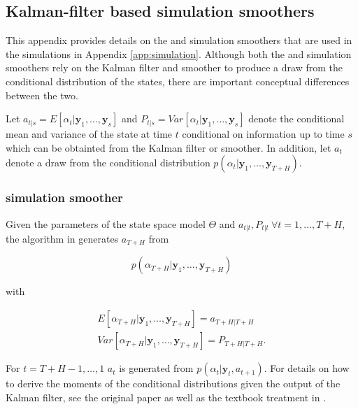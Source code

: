 \documentclass[notitlepage,a4paper,12pt]{article}
\begin{document}
\begin{ThreePartTable}
\pagebreak
\newpage

\section{Kalman-filter based simulation smoothers}\label{app:kalmansimsmoothers}

This appendix provides details on the \citet{carterkohn1994_biomtr} and \citet{durbinkoopman2002_biomtr} simulation smoothers that are used in the simulations in Appendix \ref{app:simulation}. Although both the \citet{carterkohn1994_biomtr} and \citet{durbinkoopman2002_biomtr} simulation smoothers rely on the Kalman filter and smoother to produce a draw from the conditional distribution of the states, there are important conceptual differences between the two. 

Let $a_{t|s} = E[\alpha_t|\mathbf{y}_1, \dots, \mathbf{y}_s]$ and $P_{t|s} = Var[\alpha_t|\mathbf{y}_1, \dots, \mathbf{y}_s]$ denote the conditional mean and variance of the state at time $t$ conditional on information up to time $s$ which can be obtainted from the Kalman filter or smoother. In addition, let $a_t$ denote a draw from the conditional distribution $p(\alpha_t | \mathbf{y}_1, \dots, \mathbf{y}_{T+H})$. 

\subsubsection*{\citet{carterkohn1994_biomtr} simulation smoother}

Given the parameters of the state space model $\Theta$ and  $a_{t|t}, P_{t|t} \: \forall t = 1, \dots, T+H$, the algorithm in \citet{carterkohn1994_biomtr} generates $a_{T+H}$ from 

$$
p(\alpha_{T+H}|\mathbf{y}_1, \dots, \mathbf{y}_{T+H})
$$

\noindent with

\begin{align*}
    E[\alpha_{T+H}|\mathbf{y}_1, \dots, \mathbf{y}_{T+H}] = a_{T+H|T+H} \\
    Var[\alpha_{T+H}|\mathbf{y}_1, \dots, \mathbf{y}_{T+H}] = P_{T+H|T+H}.
\end{align*}

 For $t=T+H-1, \dots, 1$ $a_t$ is generated from $p(\alpha_{t}|\mathbf{y}_t, a_{t+1})$. For details on how to derive the moments of the conditional distributions given the output of the Kalman filter, see the original paper as well as the textbook treatment in \citet{KimNelson1999mit}.


\end{ThreePartTable}
\end{document}
